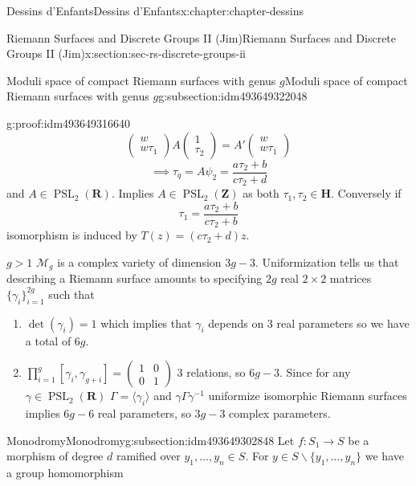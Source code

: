 \documentclass[oneside,10pt,]{book}
\numberwithin{equation}{section}
\newcommand{\inv}{^{-1}}
\newcommand{\lb}{[}
\newcommand{\rb}{]}
\newcommand{\ZZ}{\mathbf{Z}}
\newcommand{\RR}{\mathbf{R}}
\newcommand{\HH}{\mathbf{H}}
\DeclareMathOperator{\PSL}{PSL}
\newcommand{\gt}{>}
\newcommand{\amp}{&}
\begin{document}
\begin{chapterptx}{Dessins d'Enfants}{}{Dessins d'Enfants}{}{}{x:chapter:chapter-dessins}
\begin{sectionptx}{Riemann Surfaces and Discrete Groups II (Jim)}{}{Riemann Surfaces and Discrete Groups II (Jim)}{}{}{x:section:sec-rs-discrete-groups-ii}
\begin{subsectionptx}{Moduli space of compact Riemann surfaces with genus \(g\)}{}{Moduli space of compact Riemann surfaces with genus \(g\)}{}{}{g:subsection:idm493649322048}
\begin{proofptx}{}{g:proof:idm493649316640}
\begin{equation*}
\begin{pmatrix} w\\ w\tau_1 \end{pmatrix} A \begin{pmatrix}1\\ \tau_2\end{pmatrix} = A' \begin{pmatrix} w \\ w\tau_1 \end{pmatrix}
\end{equation*}
%
\begin{equation*}
\implies \tau_q = A \psi_2 = \frac{a\tau_2 + b}{c\tau_2 + d}
\end{equation*}
and \(A \in \PSL_2(\RR)\). Implies \(A\in \PSL_2(\ZZ)\) as both \(\tau_1,\tau_2 \in \HH\). Conversely if%
\begin{equation*}
\tau_1 = \frac{a\tau_2 + b}{c\tau_2 + b}
\end{equation*}
isomorphism is induced by \(T(z) = (c\tau_2 + d) z\).%
\end{proofptx}
\(g \gt 1\) \(\mathcal M_g\) is a complex variety of dimension \(3g-3\). Uniformization tells us that describing a Riemann surface amounts to specifying \(2g\) real \(2\times 2\) matrices \(\{\gamma_i\}_{i=1}^{2g}\) such that%
\begin{enumerate}
\item{}\(\det(\gamma_i) = 1\) which implies that \(\gamma_i\) depends on 3 real parameters so we have a total of \(6g\).%
\item{}\(\prod_{i=1}^g \lb \gamma_i, \gamma_{g+i}\rb = \begin{pmatrix} 1\amp 0 \\ 0\amp 1\end{pmatrix}\) 3 relations, so \(6g- 3\). Since for any \(\gamma \in \PSL_2(\RR)\) \(\Gamma = \langle \gamma_i \rangle\) and \(\gamma\Gamma \gamma\inv\) uniformize isomorphic Riemann surfaces implies \(6g-6\) real parameters, so \(3g-3\) complex parameters.%
\end{enumerate}
%
\end{subsectionptx}
%
%
\typeout{************************************************}
\typeout{************************************************}
%
\begin{subsectionptx}{Monodromy}{}{Monodromy}{}{}{g:subsection:idm493649302848}
Let \(f\colon S_1 \to S\) be a morphism of degree \(d\) ramified over \(y_1,\ldots, y_n \in S\). For \(y\in S\smallsetminus \{y_1,\ldots, y_n\}\) we have a group homomorphism%

\end{subsectionptx}
\end{sectionptx}
\end{chapterptx}
\end{document}
